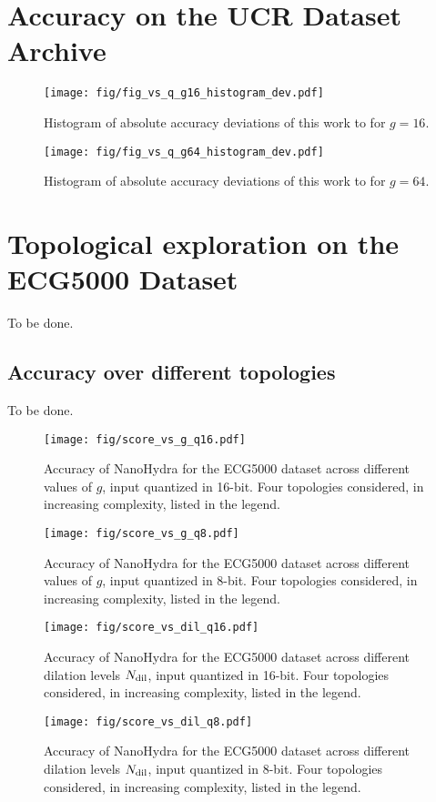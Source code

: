 \section{Accuracy on the UCR Dataset Archive}\label{sec:acc_ucr}

\begin{figure}
    \centerfloat
    \texttt{[image: fig/fig\_vs\_q\_g16\_histogram\_dev.pdf]}
    \caption{Histogram of absolute accuracy deviations of this work to \cite{Dempster2023Hydra} for $g=16$.}
    \label{fig:ucr_hist_vs_q_g16}
\end{figure}
\begin{figure}
    \centerfloat
    \texttt{[image: fig/fig\_vs\_q\_g64\_histogram\_dev.pdf]}
    \caption{Histogram of absolute accuracy deviations of this work to \cite{Dempster2023Hydra} for $g=64$.}
    \label{fig:ucr_hist_vs_q_g64}
\end{figure}

\section{Topological exploration on the ECG5000 Dataset}\label{sec:rs_arch_ecg5000}
To be done.

\subsection{Accuracy over different topologies}
To be done.

\begin{figure}[h!]
    \centerfloat
    \texttt{[image: fig/score\_vs\_g\_q16.pdf]}
    \caption{Accuracy of NanoHydra for the ECG5000 dataset across different values of $g$, input quantized in 16-bit. Four topologies considered, in increasing complexity, listed in the legend.}
    \label{fig:vs_g_q16}
\end{figure}
\begin{figure}[h!]
    \centerfloat
    \texttt{[image: fig/score\_vs\_g\_q8.pdf]}
    \caption{Accuracy of NanoHydra for the ECG5000 dataset across different values of $g$, input quantized in 8-bit. Four topologies considered, in increasing complexity, listed in the legend.}
    \label{fig:vs_g_q16}
\end{figure}
\begin{figure}[h!]
    \centerfloat
    \texttt{[image: fig/score\_vs\_dil\_q16.pdf]}
    \caption{Accuracy of NanoHydra for the ECG5000 dataset across different dilation levels $N\sb{\text{dil}}$, input quantized in 16-bit. Four topologies considered, in increasing complexity, listed in the legend.}
    \label{fig:vs_g_q16}
\end{figure}
\begin{figure}[h!]
    \centerfloat
    \texttt{[image: fig/score\_vs\_dil\_q8.pdf]}
    \caption{Accuracy of NanoHydra for the ECG5000 dataset across different dilation levels $N\sb{\text{dil}}$, input quantized in 8-bit. Four topologies considered, in increasing complexity, listed in the legend.}
    \label{fig:vs_g_q16}
\end{figure}


